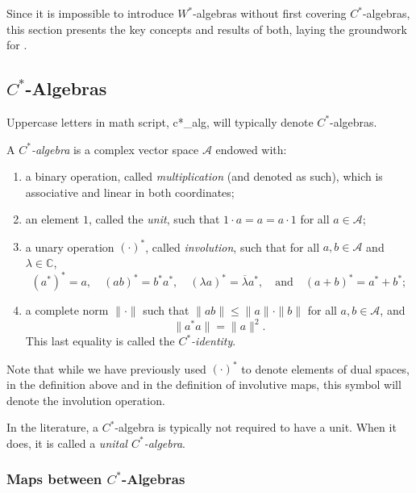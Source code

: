   
Since it is impossible to introduce \( W^* \)-algebras without first covering \( C^* \)-algebras, this section presents the key concepts and results of both, laying the groundwork for .

\subsection{\( C^* \)-Algebras}

Uppercase letters in math script, \gls{c*_alg}, will typically denote $C^*$-algebras.


\begin{definition}
  A \emph{\( C^* \)-algebra} is a complex vector space \( \mathscr{A} \) endowed with:
\begin{enumerate}
    \item a binary operation, called \emph{multiplication} (and denoted as such), which is associative and linear in both coordinates;
    \item an element \( 1 \), called the \emph{unit}, such that \( 1 \cdot a = a = a \cdot 1 \) for all \( a \in \mathscr{A} \);
    \item a unary operation \( (\cdot)^* \), called \emph{involution}, such that for all \( a, b \in \mathscr{A} \) and \( \lambda \in \mathbb{C} \),
    \[
    (a^*)^* = a, \quad (ab)^* = b^* a^*, \quad (\lambda a)^* = \overline{\lambda} a^*, \quad \text{and} \quad (a + b)^* = a^* + b^*;
    \]
    \item a complete norm \( \|\cdot\| \) such that \( \| ab \| \leq \|a\| \cdot \|b\| \) for all \( a, b \in \mathscr{A} \), and
    \[
    \|a^* a\| = \|a\|^2.
    \]
    This last equality is called the \emph{\( C^* \)-identity}.
\end{enumerate}
\end{definition}

Note that while we have previously used $(\cdot)^*$ to denote elements of dual spaces, in the definition above and in the definition of involutive maps, this symbol will denote the involution operation.

\begin{remark}  
  In the literature, a \( C^* \)-algebra is typically not required to have a unit. When it does, it is called a \emph{unital \( C^* \)-algebra}.
\end{remark}



\subsubsection{Maps between $C^*$-Algebras}

